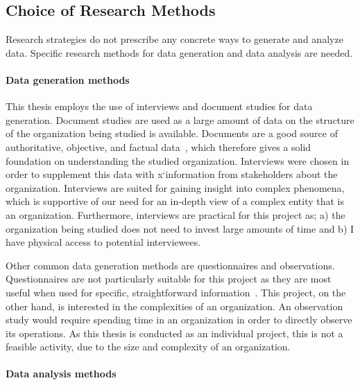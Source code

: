 \subsection{Choice of Research Methods}

Research strategies do not prescribe any concrete ways to generate and analyze data. Specific research methods for data generation and data analysis are needed. 


\paragraph*{Data generation methods}


This thesis employs the use of interviews and document studies for data generation.  Document studies are used as a large amount of data on the structure of the organization being studied is available. Documents are a good source of authoritative, objective, and factual data~\cite{denscombe2010good}, which therefore gives a solid foundation on understanding the studied organization. Interviews were chosen in order to supplement this data with x`information from stakeholders about the organization. Interviews are suited for gaining insight into complex phenomena, which is supportive of our need for an in-depth view of a complex entity that is an organization. Furthermore, interviews are practical for this project as; a) the organization being studied does not need to invest large amounts of time and b) I have physical access to potential interviewees. 

Other common data generation methods are questionnaires and observations. Questionnaires are not particularly suitable for this project as they are most useful when used for specific, straightforward information~\cite{denscombe2010good}. This project, on the other hand, is interested in the complexities of an organization. An observation study would require spending time in an organization in order to directly observe its operations. As this thesis is conducted as an individual project, this is not a feasible activity, due to the size and complexity of an organization.

\paragraph*{Data analysis methods}


